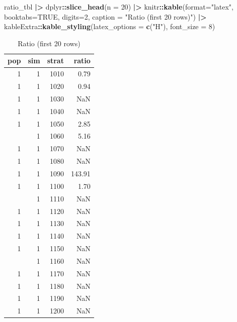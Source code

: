 \documentclass[
]{article}
\newenvironment{Shaded}{\begin{snugshade}}{\end{snugshade}}
\newcommand{\AttributeTok}[1]{\textcolor[rgb]{0.13,0.29,0.53}{#1}}
\newcommand{\ConstantTok}[1]{\textcolor[rgb]{0.56,0.35,0.01}{#1}}
\newcommand{\DecValTok}[1]{\textcolor[rgb]{0.00,0.00,0.81}{#1}}
\newcommand{\FunctionTok}[1]{\textcolor[rgb]{0.13,0.29,0.53}{\textbf{#1}}}
\newcommand{\NormalTok}[1]{#1}
\newcommand{\SpecialCharTok}[1]{\textcolor[rgb]{0.81,0.36,0.00}{\textbf{#1}}}
\newcommand{\StringTok}[1]{\textcolor[rgb]{0.31,0.60,0.02}{#1}}
\begin{document}
\begin{Shaded}
\begin{Highlighting}[]
\NormalTok{ratio\_tbl }\SpecialCharTok{|\textgreater{}}
\NormalTok{  dplyr}\SpecialCharTok{::}\FunctionTok{slice\_head}\NormalTok{(}\AttributeTok{n =} \DecValTok{20}\NormalTok{) }\SpecialCharTok{|\textgreater{}}
\NormalTok{  knitr}\SpecialCharTok{::}\FunctionTok{kable}\NormalTok{(}\AttributeTok{format=}\StringTok{"latex"}\NormalTok{, }\AttributeTok{booktabs=}\ConstantTok{TRUE}\NormalTok{, }\AttributeTok{digits=}\DecValTok{2}\NormalTok{,}
              \AttributeTok{caption =} \StringTok{"Ratio (first 20 rows)"}\NormalTok{) }\SpecialCharTok{|\textgreater{}}
\NormalTok{  kableExtra}\SpecialCharTok{::}\FunctionTok{kable\_styling}\NormalTok{(}\AttributeTok{latex\_options =} \FunctionTok{c}\NormalTok{(}\StringTok{"H"}\NormalTok{), }\AttributeTok{font\_size =} \DecValTok{8}\NormalTok{)}
\end{Highlighting}
\end{Shaded}

\begin{table}[H]

\caption{\label{tab:unnamed-chunk-10}Ratio (first 20 rows)}
\centering
\fontsize{8}{10}\selectfont
\begin{tabular}[t]{rrrr}
\toprule
pop & sim & strat & ratio\\
\midrule
1 & 1 & 1010 & 0.79\\
1 & 1 & 1020 & 0.94\\
1 & 1 & 1030 & NaN\\
1 & 1 & 1040 & NaN\\
1 & 1 & 1050 & 2.85\\
\addlinespace
1 & 1 & 1060 & 5.16\\
1 & 1 & 1070 & NaN\\
1 & 1 & 1080 & NaN\\
1 & 1 & 1090 & 143.91\\
1 & 1 & 1100 & 1.70\\
\addlinespace
1 & 1 & 1110 & NaN\\
1 & 1 & 1120 & NaN\\
1 & 1 & 1130 & NaN\\
1 & 1 & 1140 & NaN\\
1 & 1 & 1150 & NaN\\
\addlinespace
1 & 1 & 1160 & NaN\\
1 & 1 & 1170 & NaN\\
1 & 1 & 1180 & NaN\\
1 & 1 & 1190 & NaN\\
1 & 1 & 1200 & NaN\\
\bottomrule
\end{tabular}
\end{table}
\end{document}
